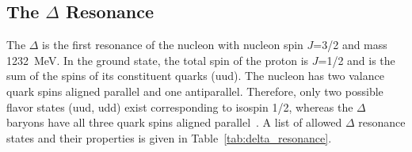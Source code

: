 \subsection{The $\Delta$ Resonance}
\label{The Delta Resonance}

The $\Delta$ is the first resonance of the nucleon with nucleon spin $J$=3/2 and mass 1232~MeV. In the ground state, the total spin of the proton is $J$=1/2 and is the sum of the spins of its constituent quarks (uud). The nucleon has two valance quark spins aligned parallel and one antiparallel. Therefore, only two possible flavor states (uud, udd) exist corresponding to isospin 1/2, whereas the $\Delta$ baryons have all three quark spins aligned parallel~\cite{Klempt:2002cu}. A list of allowed $\Delta$ resonance states and their properties is given in Table~\ref{tab:delta_resonance}.


